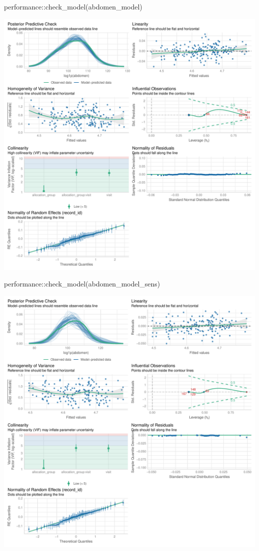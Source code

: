 \documentclass[
  letterpaper,
  DIV=11,
  numbers=noendperiod]{scrartcl}
\newenvironment{Shaded}{\begin{snugshade}}{\end{snugshade}}
\newcommand{\FunctionTok}[1]{\textcolor[rgb]{0.28,0.35,0.67}{#1}}
\newcommand{\NormalTok}[1]{\textcolor[rgb]{0.00,0.23,0.31}{#1}}
\newcommand{\SpecialCharTok}[1]{\textcolor[rgb]{0.37,0.37,0.37}{#1}}
\begin{document}
\begin{Shaded}
\begin{Highlighting}[]
\NormalTok{performance}\SpecialCharTok{::}\FunctionTok{check\_model}\NormalTok{(abdomen\_model)}
\end{Highlighting}
\end{Shaded}

\includegraphics{Outcomes_V1V2V3_files/figure-pdf/abdomen_4-1.pdf}

\begin{Shaded}
\begin{Highlighting}[]
\NormalTok{performance}\SpecialCharTok{::}\FunctionTok{check\_model}\NormalTok{(abdomen\_model\_sens)}
\end{Highlighting}
\end{Shaded}

\includegraphics{Outcomes_V1V2V3_files/figure-pdf/abdomen_4-2.pdf}
\end{document}
